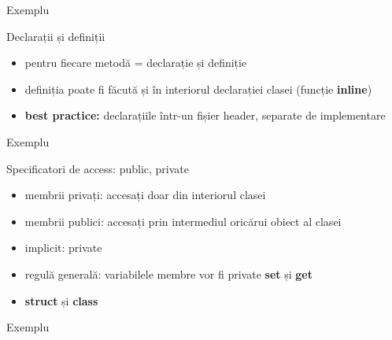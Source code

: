 \documentclass{beamer}
\begin{document}
\begin{frame}{Exemplu}
	\footnotesize{}
\end{frame}

\begin{frame}{Declarații și definiții}
  \begin{itemize}
  \item pentru fiecare metodă = declarație și definiție
  \item definiția poate fi făcută și în interiorul declarației clasei (funcție \textbf{inline})
  \item \textbf{best practice:} declarațiile într-un fișier header, separate de implementare
  \end{itemize}
\end{frame}

\begin{frame}{Exemplu}
	\footnotesize{}
\end{frame}

\begin{frame}{Specificatori de access: public, private}
  \begin{itemize}
  \item membrii privați: accesați doar din interiorul clasei
  \item membrii publici: accesați prin intermediul oricărui obiect al clasei
  \item implicit: private
  \item regulă generală: variabilele membre vor fi private  \textbf{set} și \textbf{get} 
  \item \textbf{struct} și \textbf{class}
  \end{itemize}
\end{frame}
               
\begin{frame}{Exemplu}
	\footnotesize{}
\end{frame}
\end{document}
